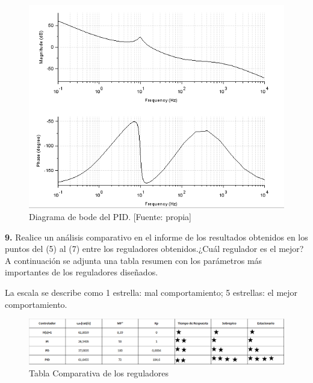 \documentclass[12pt,letterpaper]{article}
\begin{document}
\begin{figure}[hbtp]
	\centering
	\includegraphics[width = .75 \columnwidth]{bodePID.png} 
	\caption[Figura7]{Diagrama de bode del PID. [Fuente: propia]} 
	\label{fig:fig10} 
\end{figure}

\bigskip

\bigskip


\textbf{9.} Realice un análisis comparativo en el informe de los resultados obtenidos en los puntos del (5) al (7) entre los reguladores obtenidos.¿Cuál regulador es el mejor?\\

A continuación se adjunta una tabla resumen con los parámetros más importantes de los reguladores diseñados.

La escala se describe como 1 estrella: mal comportamiento; 5 estrellas: el mejor comportamiento.

\begin{figure}[hbtp]
	\centering
	\includegraphics[width = 0.9 \columnwidth]{tabla.jpg} 
	\caption[Figura7]{Tabla Comparativa de los reguladores} 
	\label{fig:fig10} 
\end{figure}
 
 

\bigskip



\bigskip
\end{document}
